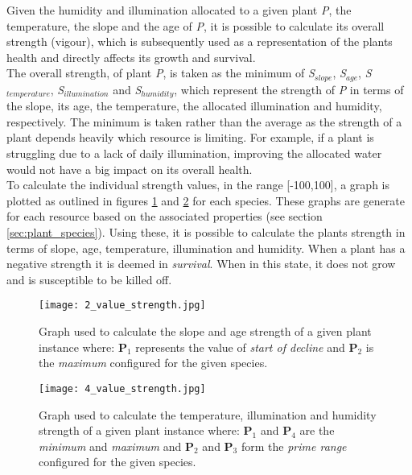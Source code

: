 Given the humidity and illumination allocated to a given plant \textit{P}, the temperature, the slope and the age of \textit{P}, it is possible to calculate its overall strength (vigour), which is subsequently used as a representation of the plants health and directly affects its growth and survival. \\
The overall strength, of plant \textit{P}, is taken as the minimum of \textit{S$_{slope}$}, \textit{S$_{age}$}, \textit{S$_{temperature}$}, \textit{S$_{illumination}$} and \textit{S$_{humidity}$}, which represent the strength of \textit{P} in terms of the slope, its age, the temperature, the allocated illumination and humidity, respectively. The minimum is taken rather than the average as the strength of a plant depends heavily which resource is limiting. For example, if a plant is struggling due to a lack of daily illumination, improving the allocated water would not have a big impact on its overall health.\\
To calculate the individual strength values, in the range [-100,100], a graph is plotted as outlined in figures \ref{fig:2_value_strength} and \ref{fig:4_value_strength} for each species. These graphs are generate for each resource based on the associated properties (see section \ref{sec:plant_species}). Using these, it is possible to calculate the plants strength in terms of slope, age, temperature, illumination and humidity. When a plant has a negative strength it is deemed in \textit{survival}. When in this state, it does not grow and is susceptible to be killed off.\\

\begin{figure}
\center
	\texttt{[image: 2\_value\_strength.jpg]}
	\caption{ Graph used to calculate the slope and age strength of a given plant instance where: \textbf{P$_{1}$} represents the value of \textit{start of decline} and \textbf{P$_{2}$} is the \textit{maximum} configured for the given species. }	
	\label{fig:2_value_strength}
\end{figure}

\begin{figure}
\center
	\texttt{[image: 4\_value\_strength.jpg]}
	\caption{ Graph used to calculate the temperature, illumination and humidity strength of a given plant instance where: \textbf{P$_{1}$} and \textbf{P$_{4}$} are the \textit{minimum} and \textit{maximum} and \textbf{P$_{2}$} and \textbf{P$_{3}$} form the \textit{prime range} configured for the given species.  }	
	\label{fig:4_value_strength}
\end{figure}

